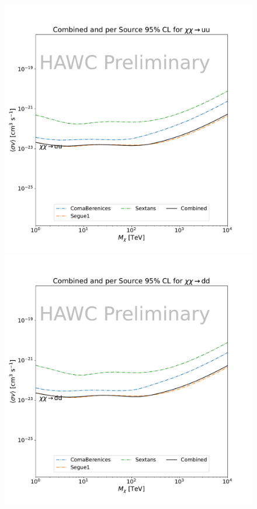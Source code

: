 \begin{figure}[h]
{    \includegraphics[scale=0.21]{figures/mtd_hawc_dm/results/Combined95_New_duck_uu_.pdf}
    \includegraphics[scale=0.21]{figures/mtd_hawc_dm/results/Combined95_New_duck_dd_.pdf}
}
\end{figure}
